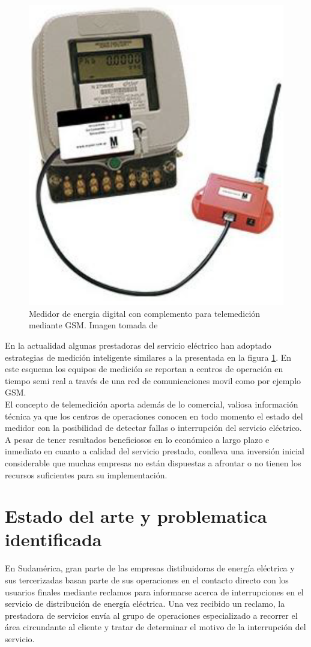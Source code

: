 \begin{figure}
	\centering
	\includegraphics[width=0.5\linewidth]{Figures/medidor_digital_con_complemento_gsm}
	\caption{Medidor de energia digital con complemento para telemedición mediante GSM. Imagen tomada de \citep{MYEEL}}
	\label{fig:medidordigitalconcomplementogsm}
\end{figure}
En la actualidad algunas prestadoras del servicio eléctrico han adoptado estrategias de medición inteligente similares a la presentada en la figura \ref{fig:medidordigitalconcomplementogsm}. En este esquema los equipos de medición se reportan a centros de operación en tiempo semi real a través de una red de comunicaciones movil como por ejemplo GSM.\\
El concepto de telemedición aporta además de lo comercial, valiosa información técnica ya que los centros de operaciones conocen en todo momento el estado del medidor con la posibilidad de detectar fallas o interrupción del servicio eléctrico.\\  
A pesar de tener resultados beneficiosos en lo económico a largo plazo e inmediato en cuanto a calidad del servicio prestado, conlleva una inversión inicial considerable que muchas empresas no están dispuestas a afrontar o no tienen los recursos suficientes para su implementación.\\
\section{Estado del arte y problematica identificada}
En Sudamérica, gran parte de las empresas distibuidoras de energía eléctrica y sus tercerizadas basan parte de sus operaciones en el contacto directo con los usuarios finales mediante reclamos para informarse acerca de interrupciones en el servicio de distribución de energía eléctrica. Una vez recibido un reclamo, la prestadora de servicios envía al grupo de operaciones especializado a recorrer el área circundante al cliente y tratar de determinar el motivo de la interrupción del servicio.\\

